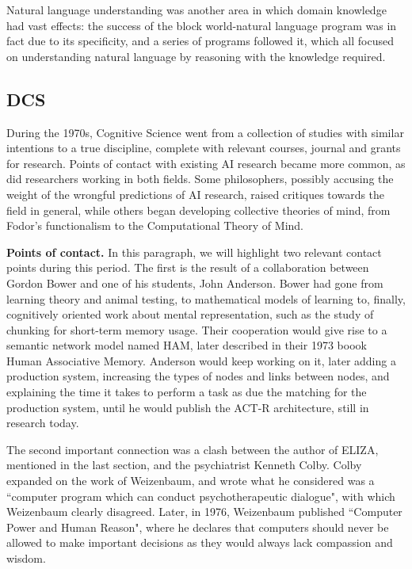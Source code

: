 \documentclass[../main.tex]{subfiles}
\begin{document}
Natural language understanding was another area in which domain knowledge had vast effects: the success of the block world-natural language program was in fact due to its specificity, and a series of programs followed it\cite{schankScriptsPlansGoals1977}\cite{wilenskyUnderstandingGoalbasedStories1978}\cite{schankComputerUnderstanding1981}, which all focused on understanding natural language by reasoning with the knowledge required.

\subsection{DCS}
During the 1970s, Cognitive Science went from a collection of studies with similar intentions to a true discipline, complete with relevant courses, journal and grants for research. Points of contact with existing AI research became more common, as did researchers working in both fields. Some philosophers, possibly accusing the weight of the wrongful predictions of AI research, raised critiques towards the field in general, while others began developing collective theories of mind, from Fodor's functionalism to the Computational Theory of Mind.

\vspace{4pt}
\textbf{Points of contact.}
In this paragraph, we will highlight two relevant contact points during this period. The first is the result of a collaboration between Gordon Bower and one of his students, John Anderson. Bower had gone from learning theory and animal testing, to mathematical models of learning to, finally, cognitively oriented work about mental representation, such as the study of chunking for short-term memory usage\cite{GordonBowerPsycNET}. Their cooperation would give rise to a semantic network model named HAM, later described in their 1973 boook Human Associative Memory\cite{andersonHumanAssociativeMemory1973}. Anderson would keep working on it, later adding a production system, increasing the types of nodes and links between nodes, and explaining the time it takes to perform a task as due the matching for the production system, until he would publish the ACT-R architecture, still in research today.

The second important connection was a clash between the author of ELIZA, mentioned in the last section, and the psychiatrist Kenneth Colby. Colby expanded on the work of Weizenbaum\cite{colbyComputerMethodPsychotherapy1966}, and wrote what he considered was a ``computer program which can conduct psychotherapeutic dialogue", with which Weizenbaum clearly disagreed. Later, in 1976, Weizenbaum published ``Computer Power and Human Reason"\cite{weizenbaumComputerPowerHuman1976}, where he declares that computers should never be allowed to make important decisions as they would always lack compassion and wisdom.
\end{document}
